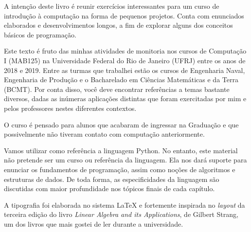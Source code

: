 \preface%
    A intenção deste livro é reunir exercícios interessantes para um curso de introdução à computação na forma de pequenos projetos. Conta com enunciados elaborados e desenvolvimentos longos, a fim de explorar alguns dos conceitos básicos de programação. \par

    Este texto é fruto das minhas atividades de monitoria nos cursos de Computação I (MAB125) na Universidade Federal do Rio de Janeiro (UFRJ) entre os anos de 2018 e 2019. Entre as turmas que trabalhei estão os cursos de Engenharia Naval, Engenharia de Produção e o Bacharelado em Ciências Matemáticas e da Terra (BCMT). Por conta disso, você deve encontrar referências a temas bastante diversos, dadas as inúmeras aplicações distintas que foram exercitadas por mim e pelos professores nestes diferentes contextos. \par

    O curso é pensado para alunos que acabaram de ingressar na Graduação e que possivelmente não tiveram contato com computação anteriormente. \par

    Vamos utilizar como referência a linguagem Python. No entanto, este material não pretende ser um curso ou referência da linguagem. Ela nos dará suporte para enunciar os fundamentos de programação, assim como noções de algoritmos e estruturas de dados. De toda forma, as especificidades da linguagem são discutidas com maior profundidade nos tópicos finais de cada capítulo. \par

    A tipografia foi elaborada no sistema {\LaTeX} e fortemente inspirada no \textit{layout} da terceira edição do livro \textit{Linear Algebra and its Applications}\cite{strang:1988}, de Gilbert Strang, um dos livros que mais gostei de ler durante a universidade. \par

    \prefacenote%